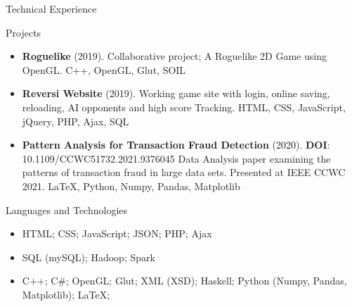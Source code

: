 \documentclass[]{mcdowellcvcustom}
\begin{document}
	\begin{cvsection}{Technical Experience}
		\begin{cvsubsection}{Projects}{}{}
			\begin{itemize}
				\item \textbf{Roguelike} (2019). Collaborative project; A Roguelike 2D Game using OpenGL.  C++, OpenGL, Glut, SOIL
				\item \textbf{Reversi Website} (2019). Working game site with login, online saving, reloading, AI opponents and high score Tracking.  HTML, CSS, JavaScript, jQuery, PHP, Ajax, SQL
				\item \textbf{Pattern Analysis for Transaction Fraud Detection} (2020). \textbf{DOI}: 10.1109/CCWC51732.2021.9376045 Data Analysis paper examining the patterns of transaction fraud in large data sets. Presented at IEEE CCWC 2021. \LaTeX, Python, Numpy, Pandas, Matplotlib
			\end{itemize}
		\end{cvsubsection}
	\end{cvsection}
	
	\vspace{10mm}

	\begin{cvsection}{Languages and Technologies}
		\begin{cvsubsection}{}{}{}	
			\begin{itemize}
				\item HTML; CSS; JavaScript; JSON; PHP; Ajax
				\item SQL (mySQL); Hadoop; Spark
				\item C++; C\#; OpenGL; Glut; XML (XSD); Haskell; Python (Numpy, Pandas, Matplotlib); \LaTeX ; 
			\end{itemize}
		\end{cvsubsection}
	\end{cvsection}
	
\end{document}
